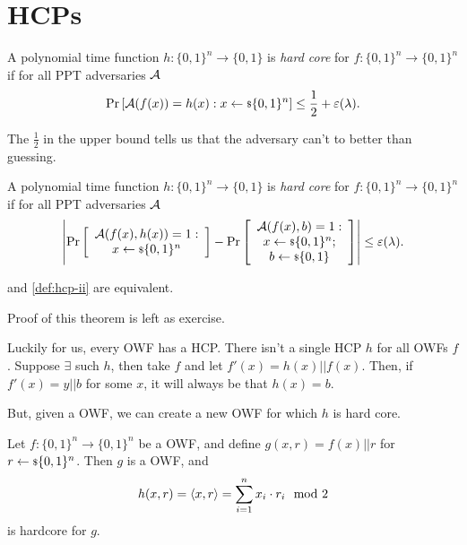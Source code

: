 \section{\aclp{HCP}}

\begin{definition} \label{def:hcp-i}
	A polynomial time function $h : \{0,1\}^{n} \to \{0,1\}$ is \emph{hard core} for $f : \{0,1\}^{n} \to \{0,1\}^{n}$ if for all \ac{PPT} adversaries $\mathcal{A}$
	\begin{equation*}
		\mathop{\mathrm{Pr}}\limits_{} \left[ {\mathcal{A}(f(x)) = h(x) : x \leftarrow {\scriptstyle \$} {\{0,1\}^{n}}} \right] \le \frac{1}{2} + \varepsilon(\lambda).
	\end{equation*}
\end{definition}
The $\frac{1}{2}$ in the upper bound tells us that the adversary can't to better than guessing.

\begin{definition} \label{def:hcp-ii}
	A polynomial time function $h : \{0,1\}^{n} \to \{0,1\}$ is \emph{hard core} for $f : \{0,1\}^{n} \to \{0,1\}^{n}$ if for all \ac{PPT} adversaries $\mathcal{A}$
	\begin{equation*}
		\left|{
			\mathop{\mathrm{Pr}}\limits_{} \left[ {
			\begin{array}{c}
				\mathcal{A}(f(x), h(x)) = 1 : \\
				x \leftarrow {\scriptstyle \$} {\{0,1\}^{n}}
			\end{array}
			} \right]
			-
			\mathop{\mathrm{Pr}}\limits_{} \left[ {
			\begin{array}{c}
				\mathcal{A}(f(x), b) = 1 : \\
				x \leftarrow {\scriptstyle \$} {\{0,1\}^{n}}; \\
				b \leftarrow {\scriptstyle \$} {\{0,1\}}
			\end{array}
			} \right]
		}\right|
		\le
		\varepsilon(\lambda).
	\end{equation*}
\end{definition}

\begin{theorem}
	 and \cref{def:hcp-ii} are equivalent.
\end{theorem}
Proof of this theorem is left as exercise.

Luckily for us, every \ac{OWF} has a \ac{HCP}.
There isn't a single \ac{HCP} $h$ for all \acp{OWF} $f$.
Suppose $\exists$ such $h$, then take $f$ and let $f'(x) = h(x) || f(x)$.
Then, if $f'(x) = y || b$ for some $x$, it will always be that $h(x) = b$.

But, given a \ac{OWF}, we can create a new \ac{OWF} for which $h$ is hard core.

\begin{theorem}[\ac{GL}, 1983]
	Let $f : \{0,1\}^n \to \{0,1\}^{n}$ be a \ac{OWF}, and define $g(x,r) = f(x) || r$ for $r \leftarrow {\scriptstyle \$} {\{0,1\}^{n}}$.
	Then $g$ is a \ac{OWF}, and 
	\begin{equation*}
		h(x,r) = \left< {x}, {r} \right> = \sum_{i=1}^{n} x_i \cdot r_i \mod 2
	\end{equation*}
	is hardcore for $g$. 
\end{theorem}

